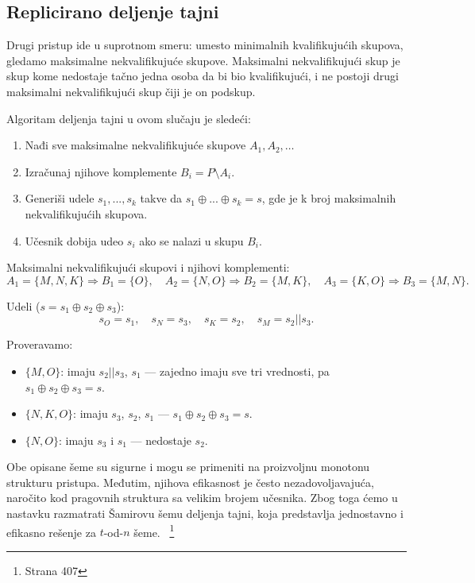 \subsection{Replicirano deljenje tajni}
Drugi pristup ide u suprotnom smeru: umesto minimalnih kvalifikujućih skupova, gledamo maksimalne nekvalifikujuće skupove.
Maksimalni nekvalifikujući skup je skup kome nedostaje tačno jedna osoba da bi bio kvalifikujući, i ne postoji drugi maksimalni nekvalifikujući skup čiji je on podskup.

Algoritam deljenja tajni u ovom slučaju je sledeći:
\begin{enumerate}
\item Nađi sve maksimalne nekvalifikujuće skupove $A_1, A_2, \ldots$
\item Izračunaj njihove komplemente $B_i = P \setminus A_i$.
\item Generiši udele $s_1, ..., s_k$ takve da $s_1 \oplus ... \oplus s_k = s$, gde je k broj maksimalnih nekvalifikujućih skupova.
\item Učesnik dobija udeo $s_i$ ako se nalazi u skupu $B_i$.
\end{enumerate}

\begin{example}
Maksimalni nekvalifikujući skupovi i njihovi komplementi:
\[
A_1 = \{M, N, K\} \Rightarrow B_1 = \{O\}, \quad
A_2 = \{N, O\} \Rightarrow B_2 = \{M, K\}, \quad
A_3 = \{K, O\} \Rightarrow B_3 = \{M, N\}.
\]
 
Udeli ($s = s_1 \oplus s_2 \oplus s_3$):
\[s_O = s_1, \quad s_N = s_3, \quad s_K = s_2, \quad s_M = s_2 || s_3.\]
 
Proveravamo:
\begin{itemize}
\item $\{M, O\}$: imaju $s_2 || s_3$, $s_1$ --- zajedno imaju sve tri vrednosti, pa $s_1 \oplus s_2 \oplus s_3 = s$.
\item $\{N, K, O\}$: imaju $s_3$, $s_2$, $s_1$ --- $s_1 \oplus s_2 \oplus s_3 = s$.
\item $\{N, O\}$: imaju $s_3$ i $s_1$ --- nedostaje $s_2$.
\end{itemize}
\end{example}

Obe opisane šeme su sigurne i mogu se primeniti na proizvoljnu monotonu strukturu pristupa. Međutim, njihova efikasnost je često nezadovoljavajuća, naročito kod pragovnih struktura sa velikim brojem učesnika. Zbog toga ćemo u nastavku razmatrati Šamirovu šemu deljenja tajni, koja predstavlja jednostavno i efikasno rešenje za $t$-od-$n$ šeme.~\cite{smart2016cryptography} \footnote{Strana 407}

